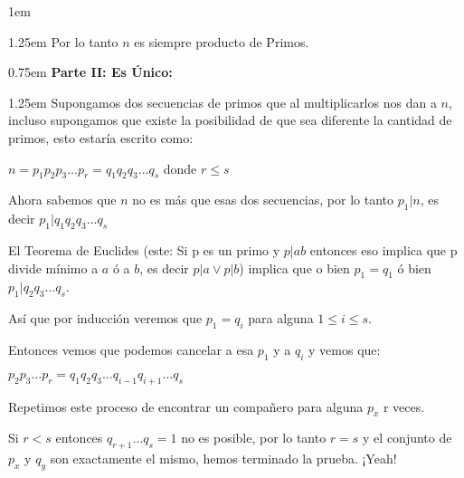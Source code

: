 \documentclass[12pt, fleqn]{report}                             %
\newenvironment{Indentation}[1][0.75em]                         %
    {\begin{adjustwidth}{#1}{}}                                     %
    {\end{adjustwidth}}                                             %
\newenvironment{SmallIndentation}[1][0.75em]                    %
    {\begin{adjustwidth}{#1}{}\begin{footnotesize}}                 %
    {\end{footnotesize}\end{adjustwidth}}                           %
\begin{document}
\begin{SmallIndentation}[1em]
\begin{Indentation}[1.25em]
                Por lo tanto $n$ es siempre producto de Primos.
            \end{Indentation}

            \begin{Indentation}[0.75em]
                \textbf{Parte II: Es Único:}
            \end{Indentation}

            \begin{Indentation}[1.25em]
                Supongamos dos secuencias de primos que al multiplicarlos nos dan
                a $n$, incluso supongamos que existe la posibilidad de que sea
                diferente la cantidad de primos, esto estaría escrito como:

                $n=p_1p_2p_3\dots p_r = q_1q_2q_3\dots q_s$ donde $r \leq s$

                Ahora sabemos que $n$ no es más que esas dos secuencias, por 
                lo tanto $p_1|n$, es decir $p_1|q_1q_2q_3\dots q_s$

                El Teorema de Euclides (este: Si p es un primo y $p|ab$ entonces
                eso implica que p divide mínimo a $a$ ó a $b$, es decir
                $p|a \lor p|b$) implica que o bien $p_1=q_1$ ó bien
                $p_1|q_2q_3\dots q_s$.

                Así que por inducción veremos que $p_1=q_i$ para alguna
                $1 \leq i \leq s$.

                Entonces vemos que podemos cancelar a esa $p_1$ y a $q_i$ y vemos
                que:

                $p_2p_3\dots p_r = q_1q_2q_3\dots q_{i-1}q_{i+1} \dots q_s$

                Repetimos este proceso de encontrar un compañero para alguna $p_x$
                r veces.

                Si $r < s$ entonces $q_{r+1} \dots q_s = 1$ no es posible,
                por lo tanto $r=s$ y el conjunto de $p_x$ y $q_y$ son exactamente
                el mismo, hemos terminado la prueba. ¡Yeah!



            \end{Indentation}
            
        \end{SmallIndentation}



        \clearpage
\end{document}
